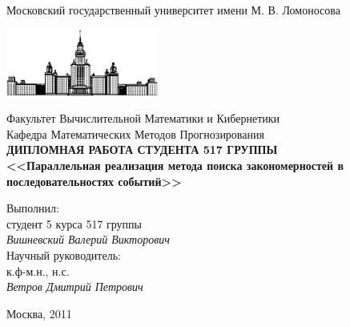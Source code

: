 \documentclass[12pt,fсeqn]{article}
\author{Вишневский~Валерий~Викторович}
\begin{document}
\begin{titlepage}
\begin{center}
    Московский государственный университет имени М. В. Ломоносова

    \bigskip
    \includegraphics[width=50mm]{msu.eps}

    \bigskip
    Факультет Вычислительной Математики и Кибернетики\\
    Кафедра Математических Методов Прогнозирования\\[10mm]

    \textsf{\large\bfseries
        ДИПЛОМНАЯ РАБОТА СТУДЕНТА 517 ГРУППЫ\\[10mm]
        <<Параллельная реализация метода поиска закономерностей в последовательностях событий>>
    }\\[10mm]

    \begin{flushright}
        \parbox{0.5\textwidth}{
            Выполнил:\\
            студент 5 курса 517 группы\\
            \emph{Вишневский Валерий Викторович}\\[5mm]
            Научный руководитель:\\
            к.ф-м.н., н.с.\\
            \emph{Ветров Дмитрий Петрович}
        }
    \end{flushright}


    \vspace{\fill}
    Москва, 2011
\end{center}
\end{titlepage}
\end{document}
